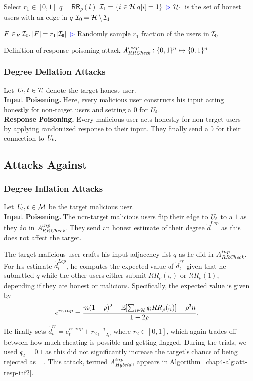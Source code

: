 \begin{algorithm}[bt]
	Select $r_1\in [0,1]$\;
	$q = \textsf{RR}_\rho (l)$\;
	$\mathcal{I}_1=\{i \in \mathcal{H}| q[i]=1\}$\;
  \hfill\textcolor{blue}{$\rhd$} $\mathcal{H}_1$ is the set of honest users with an edge in $q$\;
  $\mathcal{I}_0 = \mathcal{H} \setminus \mathcal{I}_1$\;

  $F\in_R \mathcal{I}_0, |F|=r_1|\mathcal{I}_0|$\;
  \hfill\textcolor{blue}{$\rhd$} Randomly sample $r_1$ fraction of the users in $\mathcal{I}_0$\;
  \caption[Definition of response poisoning attack $A_{\DegRRCheck}^{resp}$.]{Definition of response poisoning attack $A_{\textit{RRCheck}}^{resp}: \{0,1\}^n\mapsto\{0,1\}^n$ }\label{chap4-alg:att-resp-inf}
\end{algorithm}

\subsubsection{Degree Deflation Attacks}
Let $\textit{U}_t, t \in \mathcal{H}$ denote the target honest user. \\\noindent\textbf{Input Poisoning.} Here, every malicious user constructs his input acting honestly for non-target users and setting a $0$ for $\textit{U}_t$.
\\\noindent\textbf{Response Poisoning.} 
Every malicious user acts honestly for non-target users by applying randomized response to their input. They finally send a $0$ for their connection to $\textit{U}_t$.
\subsection{Attacks Against \DegHybrid{}}

\subsubsection{Degree Inflation Attacks}
Let $\textit{U}_t, t \in \mathcal{M}$ be the target malicious user.
\\
\noindent\textbf{Input Poisoning.} The non-target malicious users flip their edge to $\textit{U}_t$ to a $1$ as they do in $A_{\textit{RRCheck}{}}^{inp}$. They send an honest estimate of their degree $\tilde{d}^{Lap}$ as this does not affect the target.

The target malicious user crafts his input adjacency list $q$ as he did in $A_{\textit{RRCheck}}^{inp}$. For his estimate $\tilde{d}_t^{Lap}$, he 
computes the expected value of $\tilde{d}_t^{rr}$ given that he submitted $q$ while the other users either submit $RR_\rho(l_i)$ or $RR_\rho(1)$, depending if they are honest or malicious. Specifically, the expected value is given by
\[
    e^{rr,inp} = \frac{m(1-\rho)^2 + \operatorname{\mathbb{E}}[\sum_{i \in \mathcal{H}} q_i RR_\rho(l_i)] - \rho^2 n}{1-2\rho}.
\]
He finally sets $\tilde{d}_t^{rr} = e_t^{rr,inp} + r_2 \frac{\tau}{1-2\rho}$ where $r_2 \in [0,1]$, which again trades off between how much cheating is possible and getting flagged. During the trials, we used $q_2 = 0.1$ as this did not significantly increase the target's chance of being rejected as $\perp$. This attack, termed $A_{\textit{Hybrid}}^{inp}$, appears in Algorithm~\ref{chap4-alg:att-resp-inf2}.

